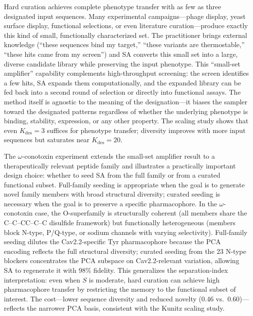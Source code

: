 Hard curation achieves complete phenotype transfer with as few as three designated
input sequences. Many experimental campaigns---phage display, yeast
surface display, functional selections, or even literature curation---produce exactly this kind of
small, functionally characterized set. The practitioner brings external knowledge (``these
sequences bind my target,'' ``these variants are thermostable,'' ``these hits came from my
screen'') and SA converts this small set into a large, diverse candidate library while preserving
the input phenotype. This ``small-set amplifier'' capability complements high-throughput screening:
the screen identifies a few hits, SA expands them computationally, and the expanded library can be
fed back into a second round of selection or directly into functional assays. The method itself is
agnostic to the meaning of the designation---it biases the sampler toward the designated patterns
regardless of whether the underlying phenotype is binding, stability, expression, or any other
property. The scaling study shows that even $K_{\mathrm{des}} = 3$ suffices for phenotype
transfer; diversity improves with more input sequences but saturates near
$K_{\mathrm{des}} = 20$.

The $\omega$-conotoxin experiment extends the small-set amplifier result to a therapeutically
relevant peptide family and illustrates a practically important design choice: whether to seed SA
from the full family or from a curated functional subset. Full-family seeding is appropriate when
the goal is to generate novel family members with broad structural diversity; curated seeding is
necessary when the goal is to preserve a specific pharmacophore. In the $\omega$-conotoxin case,
the O-superfamily is structurally coherent (all members share the C--C--CC--C--C disulfide
framework) but functionally heterogeneous (members block N-type, P/Q-type, or sodium channels
with varying selectivity). Full-family seeding dilutes the Cav2.2-specific Tyr pharmacophore
because the PCA encoding reflects the full structural diversity; curated seeding from the 23
N-type blockers concentrates the PCA subspace on Cav2.2-relevant variation, allowing SA to
regenerate it with 98\% fidelity. This generalizes the separation-index interpretation: even
when $S$ is moderate, hard curation can achieve high pharmacophore transfer by
restricting the memory to the functional subset of interest. The cost---lower sequence diversity
and reduced novelty (0.46 vs.\ 0.60)---reflects the narrower PCA basis, consistent with the
Kunitz scaling study.

